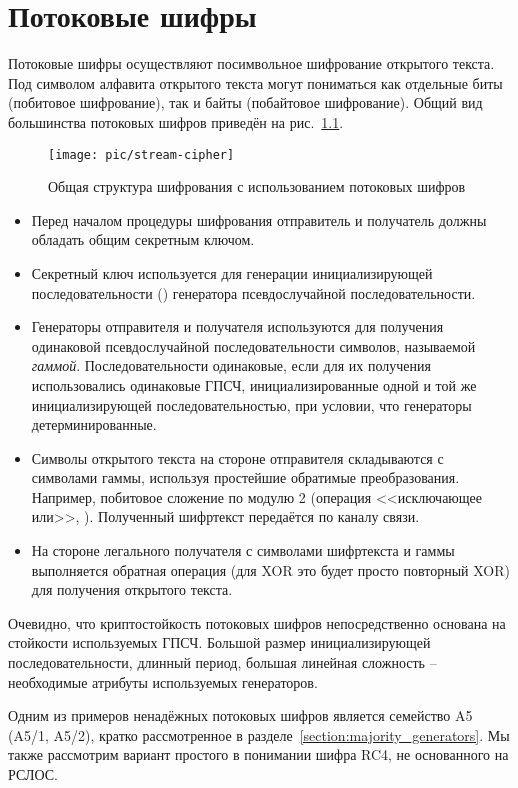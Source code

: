 \chapter{Потоковые шифры}\label{chapter-stream-ciphers}

Потоковые шифры осуществляют посимвольное шифрование открытого текста. Под символом алфавита открытого текста могут пониматься как отдельные биты (побитовое шифрование), так и байты (побайтовое шифрование). Общий вид большинства потоковых шифров приведён на рис.~\ref{fig:stream-cipher}.

\begin{figure}[hb]
	\centering
	\texttt{[image: pic/stream-cipher]}
  \caption{Общая структура шифрования с использованием потоковых шифров}
  \label{fig:stream-cipher}
\end{figure}

\begin{itemize}
	\item Перед началом процедуры шифрования отправитель и получатель должны обладать общим секретным ключом.
	\item Секретный ключ используется для генерации инициализирующей последовательности () генератора псевдослучайной последовательности.
	\item Генераторы отправителя и получателя используются для получения одинаковой псевдослучайной последовательности символов, называемой \emph{гаммой}. Последовательности одинаковые, если для их получения использовались одинаковые ГПСЧ, инициализированные одной и той же инициализирующей последовательностью, при условии, что генераторы детерминированные.
	\item Символы открытого текста на стороне отправителя складываются с символами гаммы, используя простейшие обратимые преобразования. Например, побитовое сложение по модулю 2 (операция <<исключающее или>>, ). Полученный шифртекст передаётся по каналу связи.
	\item На стороне легального получателя с символами шифртекста и гаммы выполняется обратная операция (для XOR это будет просто повторный XOR) для получения открытого текста.
\end{itemize}

Очевидно, что криптостойкость потоковых шифров непосредственно основана на стойкости используемых ГПСЧ. Большой размер инициализирующей последовательности, длинный период, большая линейная сложность -- необходимые атрибуты используемых генераторов.

Одним из примеров ненадёжных потоковых шифров является семейство A5 (A5/1, A5/2), кратко рассмотренное в разделе~\ref{section:majority_generators}. Мы также рассмотрим вариант простого в понимании шифра RC4, не основанного на РСЛОС.


